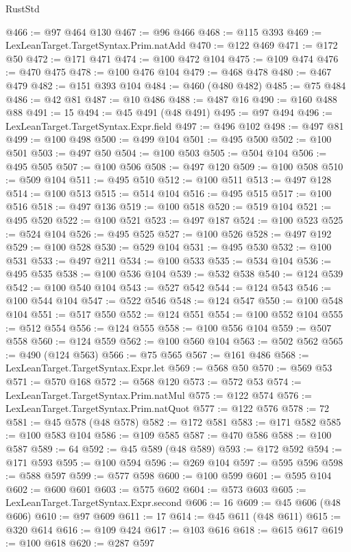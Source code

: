 \begin{lexlean}{RustStd}
\begin{coremodule}
@466 := @97 @464 @130
@467 := @96 @466
@468 := @115 @393
@469 := LexLeanTarget.TargetSyntax.Prim.natAdd
@470 := @122 @469
@471 := @172 @50
@472 := @171 @471
@474 := @100 @472 @104
@475 := @109 @474
@476 := @470 @475
@478 := @100 @476 @104
@479 := @468 @478
@480 := @467 @479
@482 := @151 @393 @104
@484 := @460 (@480 @482)
@485 := @75 @484
@486 := @42 @81
@487 := @10 @486
@488 := @487 @16
@490 := @160 @488 @88
@491 := 15
@494 := @45 @491 (@48 @491)
@495 := @97 @494
@496 := LexLeanTarget.TargetSyntax.Expr.field
@497 := @496 @102
@498 := @497 @81
@499 := @100 @498
@500 := @499 @104
@501 := @495 @500
@502 := @100 @501
@503 := @497 @50
@504 := @100 @503
@505 := @504 @104
@506 := @495 @505
@507 := @100 @506
@508 := @497 @120
@509 := @100 @508
@510 := @509 @104
@511 := @495 @510
@512 := @100 @511
@513 := @497 @128
@514 := @100 @513
@515 := @514 @104
@516 := @495 @515
@517 := @100 @516
@518 := @497 @136
@519 := @100 @518
@520 := @519 @104
@521 := @495 @520
@522 := @100 @521
@523 := @497 @187
@524 := @100 @523
@525 := @524 @104
@526 := @495 @525
@527 := @100 @526
@528 := @497 @192
@529 := @100 @528
@530 := @529 @104
@531 := @495 @530
@532 := @100 @531
@533 := @497 @211
@534 := @100 @533
@535 := @534 @104
@536 := @495 @535
@538 := @100 @536 @104
@539 := @532 @538
@540 := @124 @539
@542 := @100 @540 @104
@543 := @527 @542
@544 := @124 @543
@546 := @100 @544 @104
@547 := @522 @546
@548 := @124 @547
@550 := @100 @548 @104
@551 := @517 @550
@552 := @124 @551
@554 := @100 @552 @104
@555 := @512 @554
@556 := @124 @555
@558 := @100 @556 @104
@559 := @507 @558
@560 := @124 @559
@562 := @100 @560 @104
@563 := @502 @562
@565 := @490 (@124 @563)
@566 := @75 @565
@567 := @161 @486
@568 := LexLeanTarget.TargetSyntax.Expr.let
@569 := @568 @50
@570 := @569 @53
@571 := @570 @168
@572 := @568 @120
@573 := @572 @53
@574 := LexLeanTarget.TargetSyntax.Prim.natMul
@575 := @122 @574
@576 := LexLeanTarget.TargetSyntax.Prim.natQuot
@577 := @122 @576
@578 := 72
@581 := @45 @578 (@48 @578)
@582 := @172 @581
@583 := @171 @582
@585 := @100 @583 @104
@586 := @109 @585
@587 := @470 @586
@588 := @100 @587
@589 := 64
@592 := @45 @589 (@48 @589)
@593 := @172 @592
@594 := @171 @593
@595 := @100 @594
@596 := @269 @104
@597 := @595 @596
@598 := @588 @597
@599 := @577 @598
@600 := @100 @599
@601 := @595 @104
@602 := @600 @601
@603 := @575 @602
@604 := @573 @603
@605 := LexLeanTarget.TargetSyntax.Expr.second
@606 := 16
@609 := @45 @606 (@48 @606)
@610 := @97 @609
@611 := 17
@614 := @45 @611 (@48 @611)
@615 := @320 @614
@616 := @109 @424
@617 := @103 @616
@618 := @615 @617
@619 := @100 @618
@620 := @287 @597

\end{coremodule}
\end{lexlean}
